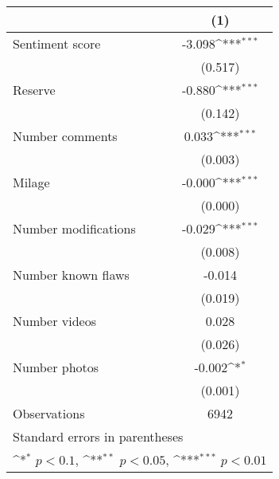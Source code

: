 {
\def\sym#1{\ifmmode^{#1}\else\(^{#1}\)\fi}
\begin{tabular}{l*{1}{c}}
\hline\hline
                    &\multicolumn{1}{c}{(1)}         \\
\hline
Sentiment score     &      -3.098\sym{***}\\
                    &     (0.517)         \\
[1em]
Reserve             &      -0.880\sym{***}\\
                    &     (0.142)         \\
[1em]
Number comments     &       0.033\sym{***}\\
                    &     (0.003)         \\
[1em]
Milage              &      -0.000\sym{***}\\
                    &     (0.000)         \\
[1em]
Number modifications&      -0.029\sym{***}\\
                    &     (0.008)         \\
[1em]
Number known flaws  &      -0.014         \\
                    &     (0.019)         \\
[1em]
Number videos       &       0.028         \\
                    &     (0.026)         \\
[1em]
Number photos       &      -0.002\sym{*}  \\
                    &     (0.001)         \\
\hline
Observations        &        6942         \\
\hline\hline
\multicolumn{2}{l}{\footnotesize Standard errors in parentheses}\\
\multicolumn{2}{l}{\footnotesize \sym{*} \(p<0.1\), \sym{**} \(p<0.05\), \sym{***} \(p<0.01\)}\\
\end{tabular}
}
